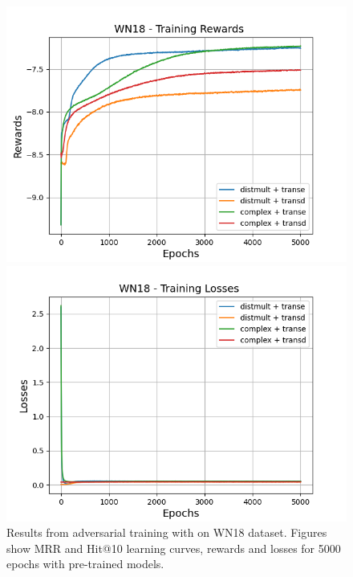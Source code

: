 \begin{figure}
    \begin{minipage}{.5\textwidth}
      \centering
      \includegraphics[width=\linewidth]{figures/results/gan_train/pretrained/random/wn18/gan_train_random_wn18_rewards.png}
    \end{minipage}%
     \begin{minipage}{.5\textwidth}
      \centering
      \includegraphics[width=\linewidth]{figures/results/gan_train/pretrained/random/wn18/gan_train_random_wn18_losses.png}
    \end{minipage}%
    \caption{Results from adversarial training with \origsampling on \textsc{WN18} dataset.
    Figures show MRR and Hit@10 learning curves, rewards and losses for 5000 epochs with pre-trained models.}
    \label{fig:gan_train_pretrained_random_wn18}
\end{figure}

